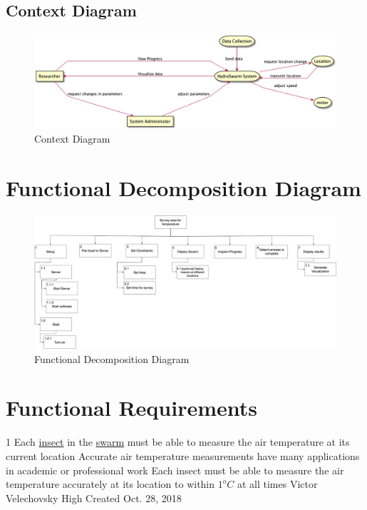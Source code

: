 \documentclass[11pt]{article}
\begin{document}
\subsection{Context Diagram}
\begin{figure}[H]
   \centering
   \includegraphics[width=\textwidth]{diagrams/context.png}
   \caption{Context Diagram}
   \label{fig:cd}
\end{figure}

\section{Functional Decomposition Diagram}
\begin{figure}[H]
   \centering
   \includegraphics[width=\textwidth]{diagrams/functionaldecomp.png}
   \caption{Functional Decomposition Diagram}
   \label{fig:fdd}
\end{figure}

\section{Functional Requirements}

\functionalRequirement
{1}
{Each \hyperref[sec:definitions]{insect} in the
\hyperref[sec:definitions]{swarm}
must be able to measure
the air temperature at its current location}
{Accurate air temperature measurements have many applications
in academic or professional work}
{Each insect must be able to measure the air temperature accurately at its location
to within \pm $ 1^o C$ at all times}
{Victor Velechovsky}
{High}
{Created Oct. 28, 2018}
\end{document}
